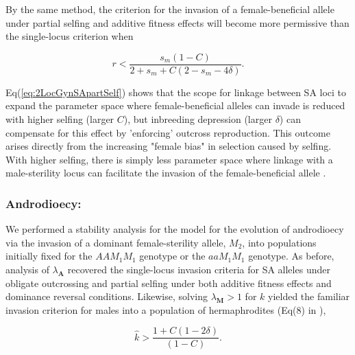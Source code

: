 \documentclass[9pt,twocolumn,twoside,lineno]{gsajnl}
\begin{document}
\noindent By the same method, the criterion for the invasion of a female-beneficial allele under partial selfing and additive fitness effects will become more permissive than the single-locus criterion when

\begin{equation}\label{eq:2LocGynSApartSelf}
	r < \frac{s_m (1 - C)}{2 + s_m +C (2 - s_m - 4 \delta)}.
\end{equation}

\noindent Eq(\ref{eq:2LocGynSApartSelf}) shows that the scope for linkage between SA loci to expand the parameter space where female-beneficial alleles can invade is reduced with higher selfing (larger $C$), but inbreeding depression (larger $\delta$) can compensate for this effect by 'enforcing' outcross reproduction. This outcome arises directly from the increasing "female bias" in selection caused by selfing. With higher selfing, there is simply less parameter space where linkage with a male-sterility locus can facilitate the invasion of the female-beneficial allele \citep{JordanConnallon2014,Olito2017}.

\subsubsection{Androdioecy:} We performed a stability analysis for the model for the evolution of androdioecy via the invasion of a dominant female-sterility allele, $M_2$, into populations initially fixed for the $AAM_1M_1$ genotype or the $aaM_1M_1$ genotype. As before, analysis of $\lambda_{\mathbf{A}}$ recovered the single-locus invasion criteria for SA alleles under obligate outcrossing and partial selfing under both additive fitness effects and dominance reversal conditions. Likewise, solving $\lambda_{\mathbf{M}} > 1$ for $k$ yielded the familiar invasion criterion for males into a population of hermaphrodites (Eq(8) in \citealt{Charlesworth1978a}),

\begin{equation}\label{eq:1LocAndro}
	\hat{k} > \frac{1 + C (1 - 2 \delta)}{(1 - C)}.
\end{equation}
\end{document}
